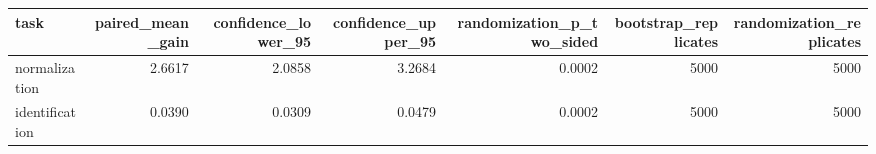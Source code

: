 \begin{tabular}{lrrrrrr}
\toprule
task & paired\_mean\_gain & confidence\_lower\_95 & confidence\_upper\_95 & randomization\_p\_two\_sided & bootstrap\_replicates & randomization\_replicates \\
\midrule
normalization & 2.6617 & 2.0858 & 3.2684 & 0.0002 & 5000 & 5000 \\
identification & 0.0390 & 0.0309 & 0.0479 & 0.0002 & 5000 & 5000 \\
\bottomrule
\end{tabular}
